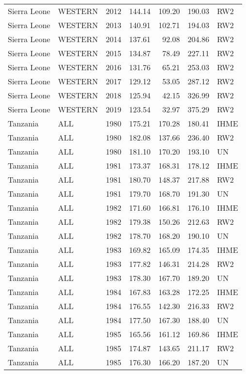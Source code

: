 \begin{longtable}{lllrrrl}
  Sierra Leone & WESTERN & 2012 & 144.14 & 109.20 & 190.03 & RW2 \\ 
  Sierra Leone & WESTERN & 2013 & 140.91 & 102.71 & 194.03 & RW2 \\ 
  Sierra Leone & WESTERN & 2014 & 137.61 & 92.08 & 204.86 & RW2 \\ 
  Sierra Leone & WESTERN & 2015 & 134.87 & 78.49 & 227.11 & RW2 \\ 
  Sierra Leone & WESTERN & 2016 & 131.76 & 65.21 & 253.03 & RW2 \\ 
  Sierra Leone & WESTERN & 2017 & 129.12 & 53.05 & 287.12 & RW2 \\ 
  Sierra Leone & WESTERN & 2018 & 125.94 & 42.15 & 326.99 & RW2 \\ 
  Sierra Leone & WESTERN & 2019 & 123.54 & 32.97 & 375.29 & RW2 \\ 
  Tanzania & ALL & 1980 & 175.21 & 170.28 & 180.41 & IHME \\ 
  Tanzania & ALL & 1980 & 182.08 & 137.66 & 236.40 & RW2 \\ 
  Tanzania & ALL & 1980 & 181.10 & 170.20 & 193.10 & UN \\ 
  Tanzania & ALL & 1981 & 173.37 & 168.31 & 178.12 & IHME \\ 
  Tanzania & ALL & 1981 & 180.70 & 148.37 & 217.88 & RW2 \\ 
  Tanzania & ALL & 1981 & 179.70 & 168.70 & 191.30 & UN \\ 
  Tanzania & ALL & 1982 & 171.60 & 166.81 & 176.10 & IHME \\ 
  Tanzania & ALL & 1982 & 179.38 & 150.26 & 212.63 & RW2 \\ 
  Tanzania & ALL & 1982 & 178.70 & 168.20 & 190.10 & UN \\ 
  Tanzania & ALL & 1983 & 169.82 & 165.09 & 174.35 & IHME \\ 
  Tanzania & ALL & 1983 & 177.82 & 146.31 & 214.28 & RW2 \\ 
  Tanzania & ALL & 1983 & 178.30 & 167.70 & 189.20 & UN \\ 
  Tanzania & ALL & 1984 & 167.83 & 163.28 & 172.25 & IHME \\ 
  Tanzania & ALL & 1984 & 176.55 & 142.30 & 216.33 & RW2 \\ 
  Tanzania & ALL & 1984 & 177.50 & 167.30 & 188.40 & UN \\ 
  Tanzania & ALL & 1985 & 165.56 & 161.12 & 169.86 & IHME \\ 
  Tanzania & ALL & 1985 & 174.87 & 143.65 & 211.17 & RW2 \\ 
  Tanzania & ALL & 1985 & 176.30 & 166.20 & 187.20 & UN \\ 

\end{longtable}
